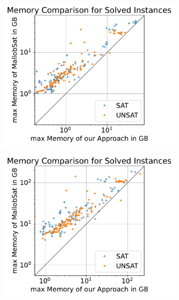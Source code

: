 \documentclass[12pt,a4paper,twoside]{scrartcl}
\numberwithin{equation}{section}
\begin{document}
\begin{figure}[!h]
  \center
  \begin{subfigure}[c]{.45\textwidth}
    \center
    \includegraphics[scale=.45]{plots/square_mem_compare/square_mem_1node.pdf}
    \label{fig:memCompare1node}
  \end{subfigure}
  \begin{subfigure}[c]{.45\textwidth}
    \center
    \includegraphics[scale=.45]{plots/square_mem_compare/square_mem_4node.pdf}
    \label{fig:memCompare4node}

\end{subfigure}
\end{figure}
\end{document}
